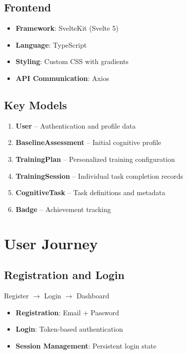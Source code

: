 \documentclass[12pt,a4paper]{article}
\begin{document}
\subsection{Frontend}
\begin{itemize}
    \item \textbf{Framework}: SvelteKit (Svelte 5)
    \item \textbf{Language}: TypeScript
    \item \textbf{Styling}: Custom CSS with gradients
    \item \textbf{API Communication}: Axios
\end{itemize}

\subsection{Key Models}
\begin{enumerate}
    \item \textbf{User} -- Authentication and profile data
    \item \textbf{BaselineAssessment} -- Initial cognitive profile
    \item \textbf{TrainingPlan} -- Personalized training configuration
    \item \textbf{TrainingSession} -- Individual task completion records
    \item \textbf{CognitiveTask} -- Task definitions and metadata
    \item \textbf{Badge} -- Achievement tracking
\end{enumerate}

\section{User Journey}

\subsection{Registration and Login}

\begin{center}
Register $\rightarrow$ Login $\rightarrow$ Dashboard
\end{center}

\begin{itemize}
    \item \textbf{Registration}: Email + Password
    \item \textbf{Login}: Token-based authentication
    \item \textbf{Session Management}: Persistent login state
\end{itemize}
\end{document}
